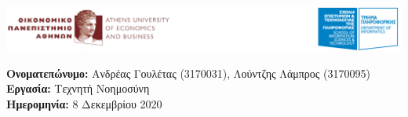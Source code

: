 \begin{titlepage}
    \vspace*{-0.6in}
    \begin{flushleft}
        \includegraphics[scale=0.44]{images/logo.png}
        
        \vspace{1cm}
        \textbf{Ονοματεπώνυμο:} Ανδρέας Γουλέτας (3170031), Λούντζης Λάμπρος (3170095)\\ 
        \textbf{Εργασία:} Τεχνητή Νοημοσύνη\\
        \textbf{Ημερομηνία:} 8 Δεκεμβρίου 2020
        
    \end{flushleft}
    \vspace{0.2in}
\end{titlepage}